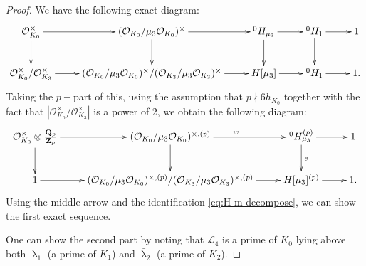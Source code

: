 \documentclass[10pt,a4paper]{amsart}
\theoremstyle{plain}
\theoremstyle{definition}
\theoremstyle{remark}
\newcommand{\Q}{\mathbf{Q}}
\newcommand{\Z}{\mathbf{Z}}
\def\cL{{\mathcal L}}
\def\cO{\mathcal O}
\DeclareMathOperator{\la}{\lambda}
\begin{document}
\begin{proof}
We have the following exact diagram: 
\[
\xymatrix{
\cO_{K_0}^\times\ar[r]\ar[d]&(\cO_{K_0}/\mu_3\cO_{K_0})^\times\ar[r]\ar[d]&^{0}H_{\mu_3}\ar[r]\ar[d]&^{0}H_1\ar[r]\ar[d]&1\\
\cO_{K_0}^\times/\cO_{K_3}^\times\ar[r]&(\cO_{K_0}/\mu_3\cO_{K_0})^\times/(\cO_{K_3}/\mu_3\cO_{K_3})^\times\ar[r]&H[\mu_3]\ar[r]&^{0}H_1\ar[r]&1.
}
\]
Taking the $p-$part of this, using the assumption that $p\nmid 6h_{K_0}$ together with the fact that $|\cO_{K_0}^\times/\cO_{K_3}^\times|$ is a power of $2$, we obtain the following diagram:
\[
\xymatrix{
\cO_{K_0}^{\times}\otimes \frac{\Q_p}{\Z_p}\ar[r]\ar[d]&(\cO_{K_0}/\mu_3\cO_{K_0})^{\times,(p)}\ar[r]^{w}\ar[d]&^{0}H_{\mu_3}^{(p)}\ar[r]\ar[d]^{e}&1\\
1\ar[r]&(\cO_{K_0}/\mu_3\cO_{K_0})^{\times,(p)}/(\cO_{K_3}/\mu_3\cO_{K_3})^{\times,(p)}\ar[r]&H[\mu_3]^{(p)}\ar[r]&1.
}
\]
Using the middle arrow and the identification \ref{eq:H-m-decompose}, we can show the first exact sequence.

One can show the second part by noting that $\cL_4$ is a prime of $K_0$ lying above both $\la_1$ (a prime of $K_1$) and $\bar{\la}_2$ (a prime of $K_2$).
\end{proof}
\end{document}
